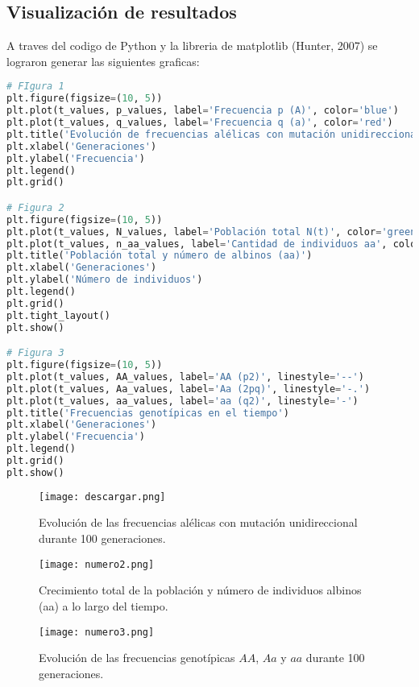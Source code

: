 \documentclass[12pt]{article}
\begin{document}
\subsection*{Visualización de resultados}
A traves del codigo de Python  y la libreria de matplotlib (Hunter, 2007) se lograron generar las siguientes graficas:

\begin{lstlisting}[language=Python, caption={Simulación de evolución genética con mutación unidireccional: Visualización de graficos}]
# FIgura 1
plt.figure(figsize=(10, 5))
plt.plot(t_values, p_values, label='Frecuencia p (A)', color='blue')
plt.plot(t_values, q_values, label='Frecuencia q (a)', color='red')
plt.title('Evolución de frecuencias alélicas con mutación unidireccional')
plt.xlabel('Generaciones')
plt.ylabel('Frecuencia')
plt.legend()
plt.grid()

# Figura 2
plt.figure(figsize=(10, 5))
plt.plot(t_values, N_values, label='Población total N(t)', color='green')
plt.plot(t_values, n_aa_values, label='Cantidad de individuos aa', color='darkred')
plt.title('Población total y número de albinos (aa)')
plt.xlabel('Generaciones')
plt.ylabel('Número de individuos')
plt.legend()
plt.grid()
plt.tight_layout()
plt.show()

# Figura 3
plt.figure(figsize=(10, 5))
plt.plot(t_values, AA_values, label='AA (p2)', linestyle='--')
plt.plot(t_values, Aa_values, label='Aa (2pq)', linestyle='-.')
plt.plot(t_values, aa_values, label='aa (q2)', linestyle='-')
plt.title('Frecuencias genotípicas en el tiempo')
plt.xlabel('Generaciones')
plt.ylabel('Frecuencia')
plt.legend()
plt.grid()
plt.show()
\end{lstlisting}
\begin{figure}[H]
    \centering
    \texttt{[image: descargar.png]}
    \caption{Evolución de las frecuencias alélicas con mutación unidireccional durante 100 generaciones.}
\end{figure}

\begin{figure}[H]
    \centering
    \texttt{[image: numero2.png]}
    \caption{Crecimiento total de la población y número de individuos albinos (aa) a lo largo del tiempo.}
\end{figure}

\begin{figure}[H]
    \centering
    \texttt{[image: numero3.png]}
    \caption{Evolución de las frecuencias genotípicas $AA$, $Aa$ y $aa$ durante 100 generaciones.}
\end{figure}
\end{document}
